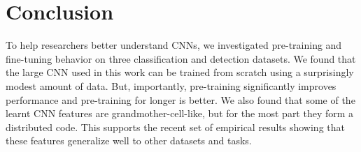\section{Conclusion}
To help researchers better understand CNNs, we investigated pre-training and fine-tuning behavior on three classification and detection datasets.
We found that the large CNN used in this work can be trained from scratch using a surprisingly modest amount of data.
But, importantly, pre-training significantly improves performance and pre-training for longer is better.
We also found that some of the learnt CNN features are grandmother-cell-like, but for the most part they form a distributed code.
This supports the recent set of empirical results showing that these features generalize well to other datasets and tasks.
